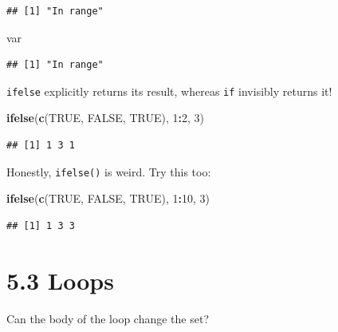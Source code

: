 \documentclass[]{book}
\newenvironment{Shaded}{\begin{snugshade}}{\end{snugshade}}
\newcommand{\DecValTok}[1]{\textcolor[rgb]{0.00,0.00,0.81}{#1}}
\newcommand{\KeywordTok}[1]{\textcolor[rgb]{0.13,0.29,0.53}{\textbf{#1}}}
\newcommand{\NormalTok}[1]{#1}
\newcommand{\OperatorTok}[1]{\textcolor[rgb]{0.81,0.36,0.00}{\textbf{#1}}}
\newcommand{\OtherTok}[1]{\textcolor[rgb]{0.56,0.35,0.01}{#1}}
\begin{document}
\begin{verbatim}
## [1] "In range"
\end{verbatim}

\begin{Shaded}
\begin{Highlighting}[]
\NormalTok{var}
\end{Highlighting}
\end{Shaded}

\begin{verbatim}
## [1] "In range"
\end{verbatim}

\texttt{ifelse} explicitly returns its result, whereas \texttt{if} invisibly returns it!

\begin{Shaded}
\begin{Highlighting}[]
\KeywordTok{ifelse}\NormalTok{(}\KeywordTok{c}\NormalTok{(}\OtherTok{TRUE}\NormalTok{, }\OtherTok{FALSE}\NormalTok{, }\OtherTok{TRUE}\NormalTok{), }\DecValTok{1}\OperatorTok{:}\DecValTok{2}\NormalTok{, }\DecValTok{3}\NormalTok{)}
\end{Highlighting}
\end{Shaded}

\begin{verbatim}
## [1] 1 3 1
\end{verbatim}

Honestly, \texttt{ifelse()} is weird. Try this too:

\begin{Shaded}
\begin{Highlighting}[]
\KeywordTok{ifelse}\NormalTok{(}\KeywordTok{c}\NormalTok{(}\OtherTok{TRUE}\NormalTok{, }\OtherTok{FALSE}\NormalTok{, }\OtherTok{TRUE}\NormalTok{), }\DecValTok{1}\OperatorTok{:}\DecValTok{10}\NormalTok{, }\DecValTok{3}\NormalTok{)}
\end{Highlighting}
\end{Shaded}

\begin{verbatim}
## [1] 1 3 3
\end{verbatim}

\hypertarget{loops}{%
\section*{5.3 Loops}\label{loops}}

Can the body of the loop change the set?
\end{document}
